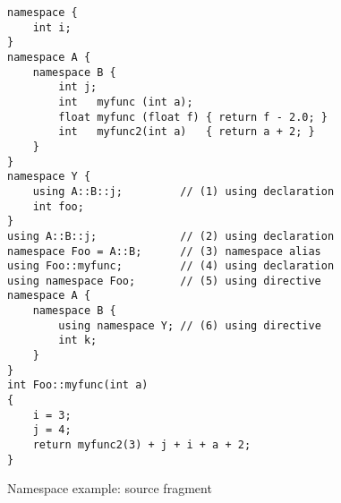 \begin{figure}[p]
\begin{lstlisting}
namespace {
    int i;
}
namespace A {
    namespace B {
        int j;
        int   myfunc (int a);
        float myfunc (float f) { return f - 2.0; }
        int   myfunc2(int a)   { return a + 2; }
    }
}
namespace Y {
    using A::B::j;         // (1) using declaration
    int foo;
}
using A::B::j;             // (2) using declaration
namespace Foo = A::B;      // (3) namespace alias
using Foo::myfunc;         // (4) using declaration
using namespace Foo;       // (5) using directive
namespace A {
    namespace B {
        using namespace Y; // (6) using directive
        int k;
    }
}
int Foo::myfunc(int a)
{
    i = 3;
    j = 4;
    return myfunc2(3) + j + i + a + 2;
}
\end{lstlisting}
\caption{Namespace example: source fragment}
\label{fig:namespaceexamplesourcefragment}
\end{figure}



